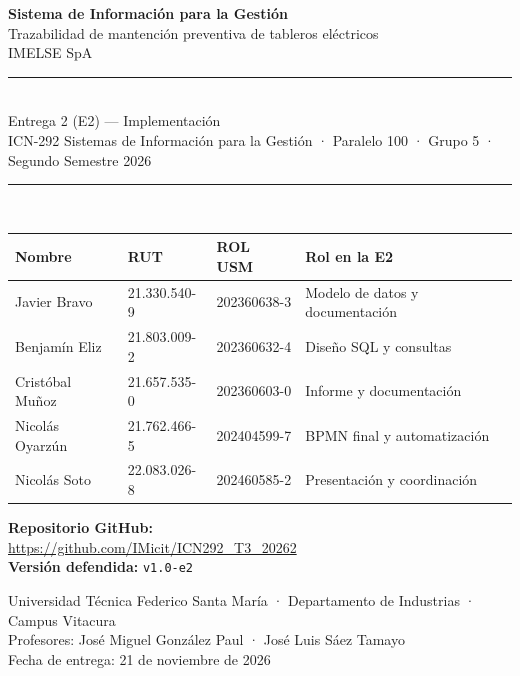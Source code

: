 \documentclass[10pt,letterpaper]{article}
\newcommand{\grupo}{5}
\newcommand{\repo}{https://github.com/IMicit/ICN292\_T3\_20262}
\newcommand{\tag}{v1.0-e2}
\begin{document}
\begin{titlepage}
\centering
\vspace*{2cm}

{\Large\bfseries Sistema de Información para la Gestión}\\[0.4cm]
{\Large Trazabilidad de mantención preventiva de tableros eléctricos}\\[0.3cm]
{\large IMELSE SpA}\\[1.5cm]

\rule{\textwidth}{0.8pt}\\[0.4cm]
{\large Entrega 2 (E2) — Implementación}\\[0.2cm]
{\normalsize ICN-292 Sistemas de Información para la Gestión · Paralelo 100 · Grupo \grupo{} · Segundo Semestre 2026}\\[0.2cm]
\rule{\textwidth}{0.8pt}\\[1.5cm]

\begin{tabular}{@{}llll@{}}
\toprule
\textbf{Nombre} & \textbf{RUT} & \textbf{ROL USM} & \textbf{Rol en la E2} \\
\midrule
Javier Bravo    & 21.330.540-9 & 202360638-3 & Modelo de datos y documentación \\
Benjamín Eliz   & 21.803.009-2 & 202360632-4 & Diseño SQL y consultas \\
Cristóbal Muñoz & 21.657.535-0 & 202360603-0 & Informe y documentación \\
Nicolás Oyarzún & 21.762.466-5 & 202404599-7 & BPMN final y automatización \\
Nicolás Soto    & 22.083.026-8 & 202460585-2 & Presentación y coordinación \\
\bottomrule
\end{tabular}

\vspace{1.2cm}
\textbf{Repositorio GitHub:}\\
\url{\repo}\\[0.2cm]
\textbf{Versión defendida:} \texttt{\tag}

\vfill
{\small Universidad Técnica Federico Santa María · Departamento de Industrias · Campus Vitacura\\
Profesores: José Miguel González Paul · José Luis Sáez Tamayo\\
Fecha de entrega: 21 de noviembre de 2026}
\end{titlepage}

\tableofcontents
\newpage

\end{document}
